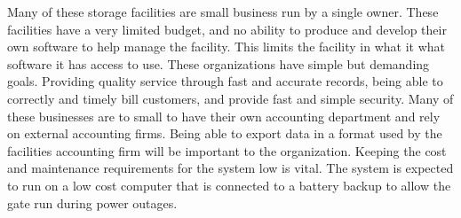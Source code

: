 \documentclass[a4paper,12pt]{report}
\begin{document}
Many of these storage facilities are small business run by a single owner. These facilities have a very limited budget, and no ability to produce and develop their own software to help manage the facility.  This limits the facility in what it what software it has access to use.  These organizations have simple but demanding goals.  Providing quality service through fast and accurate records, being able to correctly and timely bill customers, and provide fast and simple security.  Many of these businesses are to small to have their own accounting department and rely on external accounting firms.  Being able to export data in a format used by the facilities accounting firm will be important to the organization.  Keeping the cost and maintenance requirements for the system low is vital.  The system is expected to run on a low cost computer that is connected to a battery backup to allow the gate run during power outages.  
 
\end{document}
